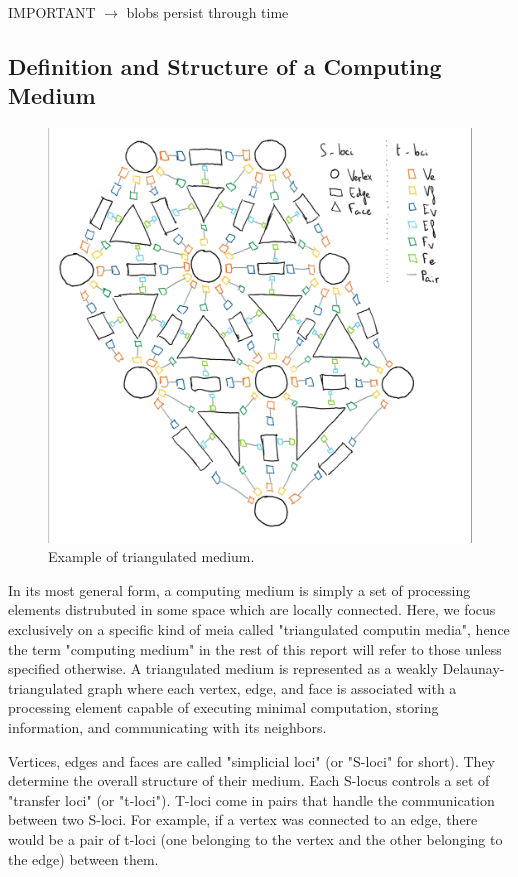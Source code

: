 \documentclass{article}
\begin{document}
IMPORTANT $\longrightarrow$ blobs persist through time

\subsection{Definition and Structure of a Computing Medium}

\begin{figure}[H]
	\centering\includegraphics[width=0.9\linewidth]{assets/handdrawn_medium.png}
	\caption{Example of triangulated medium.}
	\label{fig:example_structure}
\end{figure}

In its most general form, a computing medium is simply a set of processing elements distrubuted in some space which are locally connected. Here, we focus exclusively on a specific kind of meia called "triangulated computin media", hence the term "computing medium" in the rest of this report will refer to those unless specified otherwise. A triangulated medium is represented as a weakly Delaunay-triangulated graph where each vertex, edge, and face is associated with a processing element capable of executing minimal computation, storing information, and communicating with its neighbors.

Vertices, edges and faces are called "simplicial loci" (or "S-loci" for short). They determine the overall structure of their medium. Each S-locus controls a set of "transfer loci" (or "t-loci"). T-loci come in pairs that handle the communication between two S-loci. For example, if a vertex was connected to an edge, there would be a pair of t-loci (one belonging to the vertex and the other belonging to the edge) between them.
\end{document}
